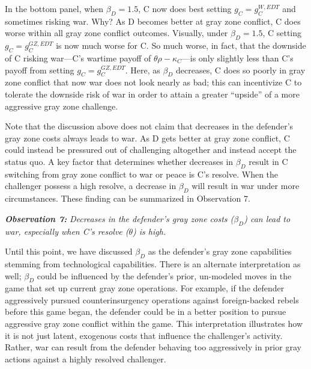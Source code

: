 \documentclass[11pt,letterpaper,pdftex,dvipsnames,table]{article}
\begin{document}
In the bottom panel, when $\beta_{D}=1.5$, C now does best setting $g_{C}=g_{C}^{W,EDT}$ and sometimes risking war. Why? As D becomes better at gray zone conflict, C does worse within all gray zone conflict outcomes. Visually, under $\beta_{D}=1.5$, C setting $g_{C}=g_{C}^{GZ,EDT}$ is now much worse for C. So much worse, in fact, that the downside of C risking war---C's wartime payoff of $ \theta\rho-\kappa_C$---is only slightly less than C's payoff from setting $g_{C}=g_{C}^{GZ,EDT}$. Here, as $\beta_{D}$ decreases, C does so poorly in gray zone conflict that now war does not look nearly as bad; this can incentivize C to tolerate the downside risk of war in order to attain a greater ``upside'' of a more aggressive gray zone challenge.

Note that the discussion above does not claim that decreases in the defender's gray zone costs always leads to war. As D gets better at gray zone conflict, C could instead be pressured out of challenging altogether and instead accept the status quo. A key factor that determines whether decreases in $\beta_{D}$ result in C switching from gray zone conflict to war or peace is C's resolve. When the challenger possess a high resolve, a decrease in $\beta_{D}$ will result in war under more circumstances. These finding can be summarized in Observation 7.

\textbf{\textit{Observation 7:}}\textit{ Decreases in the defender's gray zone costs ($\beta_{D}$) can lead to war, especially when C's resolve ($\theta$) is high.}

Until this point, we have discussed $\beta_{D}$ as the defender's gray zone capabilities stemming from technological capabilities. There is an alternate interpretation as well; $\beta_{D}$ could be influenced by the defender's prior, un-modeled moves in the game that set up current gray zone operations. For example, if the defender aggressively pursued counterinsurgency operations against foreign-backed rebels before this game began, the defender could be in a better position to pursue aggressive gray zone conflict within the game. This interpretation illustrates how it is not just latent, exogenous costs that influence the challenger's activity. Rather, war can result from the defender behaving too aggressively in prior gray actions against a highly resolved challenger.
\end{document}
